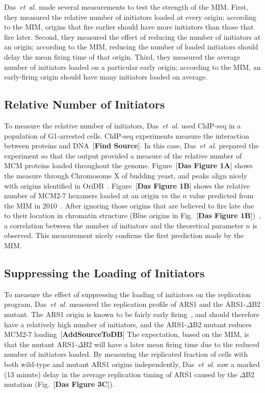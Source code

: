 {	Das~\emph{et~al.} made several measurements to test the strength of the MIM.
	First, they measured the relative number of initiators loaded at every origin; according to the MIM, origins that fire earlier should have more initiators than those that fire later.
	Second, they measured the effect of reducing the number of initiators at an origin; according to the MIM, reducing the number of loaded initiators should delay the mean firing time of that origin.
	Third, they measured the average number of initiators loaded on a particular early origin; according to the MIM, an early-firing origin should have many initiators loaded on average.
	
		\subsection{Relative Number of Initiators}
		\label{subsec:RelativeNo}
		
		To measure the relative number of initiators, Das~\emph{et~al.} used ChIP-seq in a population of G1-arrested cells.
		ChIP-seq experiments measure the interaction between proteins and DNA~[\textbf{Find Source}].
		In this case, Das~\emph{et~al.} prepared the experiment so that the output provided a measure of the relative number of MCM proteins loaded throughout the genome.
		Figure~[\textbf{Das Figure 1A}] shows the measure through Chromosome X of budding yeast, and peaks align nicely with origins identified in OriDB~\cite{OriDB}.
		Figure~[\textbf{Das Figure 1B}] shows the relative number of MCM2-7 hexamers loaded at an origin vs the $n$ value predicted from the MIM in 2010~\cite{ScottsPaper}.
		After ignoring those origins that are believed to fire late due to their location in chromatin structure (Blue origins in Fig.~[\textbf{Das Figure 1B}])~\cite{Chromatin}, a correlation between the number of initiators and the theoretical parameter $n$ is observed.
		This measurement nicely confirms the first prediction made by the MIM.
		
		
		\subsection{Suppressing the Loading of Initiators}
		\label{subsec:SuppressingInitiators}
		
		To measure the effect of suppressing the loading of initiators on the replication program, Das~\emph{et~al.} measured the replication profile of ARS1 and the ARS1-$\Delta$B2 mutant.
		The ARS1 origin is known to be fairly early firing~\cite{OriDB}, and should therefore have a relatively high number of initiators, and the ARS1-$\Delta$B2 mutant reduces MCM2-7 loading~[\textbf{AddSourceToDB}]%
		The expectation, based on the MIM, is that the mutant ARS1-$\Delta$B2 will have a later mean firing time due to the reduced number of initiators loaded.
		By measuring the replicated fraction of cells with both wild-type and mutant ARS1 origins independently, Das~\emph{et~al.} saw a marked (13 minute) delay in the average replication timing of ARS1 caused by the $\Delta$B2 mutation (Fig.~[\textbf{Das Figure 3C}]).
		
}
